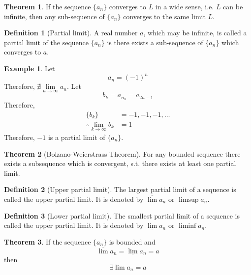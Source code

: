 \documentclass[fleqn, a4paper, 12pt, twoside]{article}
\theoremstyle{definition}
\newtheorem{example}{Example}
\newtheorem{definition}{Definition}
\theoremstyle{theorem}
\newtheorem{theorem}{Theorem}
\begin{document}
{\begin{theorem}
	If the sequence $\{a_n\}$ converges to $L$ in a wide sense, i.e. $L$ can be infinite, then any sub-sequence of $\{a_n\}$ converges to the same limit $L$.
	\label{Any subsequence converges to the limit of the sequence}
\end{theorem}

\begin{definition}[Partial limit]
	A real number $a$, which may be infinite, is called a partial limit of the sequence $\{a_n\}$ is there exists a sub-sequence of $\{a_n\}$ which converges to $a$.
\end{definition}

\begin{example}
	Let
	\begin{equation*}
		a_n = (-1)^n
	\end{equation*}
	Therefore, $\nexists \lim\limits_{n \to \infty} a_n$.
	Let
	\begin{equation*}
		b_k = a_{n_k} = a_{2n - 1}
	\end{equation*}
	Therefore,
	\begin{align*}
		\{b_k\} &= -1, -1, -1, \dots\\
		\therefore \lim\limits_{k \to \infty} b_k &= 1
	\end{align*}
	Therefore, $-1$ is a partial limit of $\{a_n\}$.
\end{example}

\begin{theorem}[Bolzano-Weierstrass Theorem]
	For any bounded sequence there exists a subsequence which is convergent, s.t. there exists at least one partial limit.
	\label{Bolzano-Weierstrass Theorem}
\end{theorem}

\begin{definition}[Upper partial limit]
	The largest partial limit of a sequence is called the upper partial limit.
	It is denoted by $\overline{\lim} a_n$ or $\limsup a_n$.
\end{definition}

\begin{definition}[Lower partial limit]
	The smallest partial limit of a sequence is called the upper partial limit.
	It is denoted by $\underline{\lim} a_n$ or $\liminf a_n$.
\end{definition}

\begin{theorem}
	If the sequence $\{a_n\}$ is bounded and 
	\begin{equation*}
		\overline{\lim} a_n = \underline{\lim} a_n = a
	\end{equation*}
	then 
	\begin{equation*}
		\exists \lim a_n = a
	\end{equation*}
	\label{Equal upper and lower partial limits imply existence of limit}
\end{theorem}

}
\end{document}
